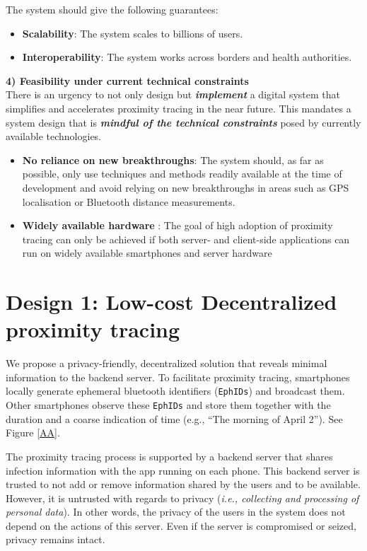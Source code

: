 \documentclass[10.8pt,a4paper]{article}
\begin{document}
The system should give the following guarantees:
\begin{itemize}\itemsep0pt
\item \textbf{Scalability}:  The system scales to billions of users.
\item \textbf{Interoperability}:  The system works across borders and health authorities.
\end{itemize}
\textbf{4) Feasibility under current technical constraints}\\
There is an urgency to not only design but \textbf{\textit{implement}} a digital system that simplifies and accelerates proximity tracing in the near future. This mandates a system design that is \textbf{\textit{mindful of the technical constraints}}  posed by currently available technologies.
\begin{itemize}\itemsep0pt
\item \textbf{No reliance on new breakthroughs}: The system should, as far as possible, only
use techniques and methods readily available at the time of development and avoid
relying on new breakthroughs in areas such as GPS localisation or Bluetooth
distance measurements.
\item \textbf{Widely available hardware} : The goal of high adoption of proximity tracing can only
be achieved if both server- and client-side applications can run on widely available
smartphones and server hardware
\end{itemize}
\clearpage


\section{Design 1: Low-cost Decentralized proximity tracing}
We propose a privacy-friendly, decentralized solution that reveals minimal information to the backend server. To facilitate proximity tracing, smartphones locally generate ephemeral bluetooth identifiers (\texttt{EphIDs}) and broadcast them. Other smartphones observe these \texttt{EphIDs} and store them together with the duration and a coarse indication of time (e.g., “The morning of April 2”). See Figure \ref{AA}.

The proximity tracing process is supported by a backend server that shares infection
information with the app running on each phone. This backend server is trusted to not add or remove information shared by the users and to be available. However, it is untrusted with regards to privacy (\textit{i.e., collecting and processing of personal data}). In other words, the privacy of the users in the system does not depend on the actions of this server. Even if the server is compromised or seized, privacy remains intact.
\end{document}
